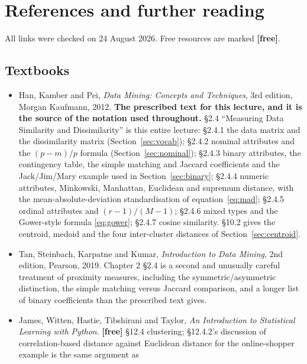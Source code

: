 \documentclass[11pt]{article}
\begin{document}
\section{References and further reading}
\label{sec:refs}

All links were checked on 24 August 2026. Free resources are marked
\textbf{[free]}.

\subsection*{Textbooks}

\begin{itemize}[leftmargin=*]
  \item Han, Kamber and Pei, \emph{Data Mining: Concepts and Techniques},
    3rd edition, Morgan Kaufmann, 2012. \textbf{The prescribed text for this
    lecture, and it is the source of the notation used throughout.} \S2.4
    ``Measuring Data Similarity and Dissimilarity'' is this entire lecture:
    \S2.4.1 the data matrix and the dissimilarity matrix
    (Section~\ref{sec:vocab}); \S2.4.2 nominal attributes and the
    $(p-m)/p$ formula (Section~\ref{sec:nominal}); \S2.4.3 binary
    attributes, the contingency table, the simple matching and Jaccard
    coefficients and the Jack/Jim/Mary example used in
    Section~\ref{sec:binary}; \S2.4.4 numeric attributes, Minkowski,
    Manhattan, Euclidean and supremum distance, with the
    mean-absolute-deviation standardisation of
    equation~\eqref{eq:mad}; \S2.4.5 ordinal attributes and
    $(r-1)/(M-1)$; \S2.4.6 mixed types and the Gower-style formula
    \eqref{eq:gower}; \S2.4.7 cosine similarity. \S10.2 gives the centroid,
    medoid and the four inter-cluster distances of
    Section~\ref{sec:centroid}.
  \item Tan, Steinbach, Karpatne and Kumar, \emph{Introduction to Data
    Mining}, 2nd edition, Pearson, 2019. Chapter 2 \S2.4 is a second and
    unusually careful treatment of proximity measures, including the
    symmetric/asymmetric distinction, the simple matching versus Jaccard
    comparison, and a longer list of binary coefficients than the prescribed
    text gives.
  \item James, Witten, Hastie, Tibshirani and Taylor, \emph{An Introduction
    to Statistical Learning with Python}. \textbf{[free]} \S12.4 clustering;
    \S12.4.2's discussion of correlation-based distance against Euclidean
    distance for the online-shopper example is the same argument as

\end{itemize}
\end{document}
